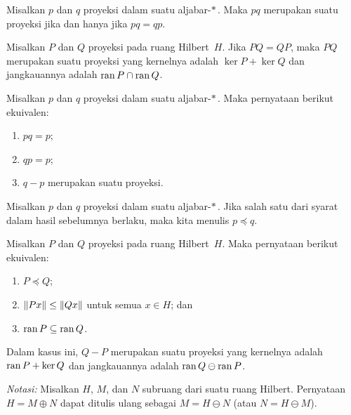 \begin{prop} Misalkan $p$ dan $q$ proyeksi dalam suatu aljabar-$*\,$. Maka $pq$ merupakan suatu
proyeksi jika dan hanya jika $pq = qp$.
\end{prop}

\begin{prop} Misalkan $P$ dan $Q$ proyeksi pada ruang Hilbert~$H$. Jika $PQ = QP$, maka
$PQ$ merupakan suatu proyeksi yang kernelnya adalah $\ker P + \ker Q$ dan jangkauannya adalah $\operatorname{ran} P \cap
\operatorname{ran} Q$.
\end{prop}

\begin{prop} Misalkan $p$ dan $q$ proyeksi dalam suatu aljabar-$*\,$. Maka pernyataan berikut ekuivalen:
 \begin{enumerate}[label=\rm{(\alph*)}]
  \item $pq = p$;
  \item $qp = p$;
  \item $q - p$ merupakan suatu proyeksi.
 \end{enumerate}
\end{prop}

\begin{defn}\label{0022251} Misalkan $p$ dan $q$ proyeksi dalam suatu aljabar-$*\,$.  Jika salah satu
dari syarat dalam hasil sebelumnya berlaku, maka kita
menulis $p \preceq q$.
\end{defn}

\begin{prop} Misalkan $P$ dan $Q$ proyeksi pada ruang Hilbert~$H$. Maka pernyataan berikut ekuivalen:
 \begin{enumerate}[label=\rm{(\alph*)}]
  \item $P \preceq Q$;
  \item $\lVert Px\rVert \le \lVert Qx\rVert$ untuk semua $x \in H$; dan
  \item $\operatorname{ran} P \subseteq \operatorname{ran} Q$.
 \end{enumerate}
Dalam kasus ini, $Q - P$ merupakan suatu proyeksi yang kernelnya adalah $\operatorname{ran} P + \ker Q$ dan jangkauannya adalah $\operatorname{ran} Q \ominus \operatorname{ran} P$.
\end{prop}

\noindent\emph{Notasi:} Misalkan $H$, $M$, dan $N$ subruang dari suatu ruang Hilbert. Pernyataan
$H = M \oplus N$ dapat ditulis ulang sebagai $M = H \ominus N$ (atau $N = H \ominus M$).


